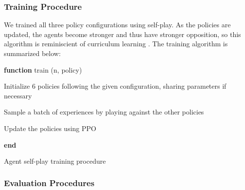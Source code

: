 \documentclass[12pt, a4paper, twocolumn]{article}
\begin{document}
\subsubsection{Training Procedure}

We trained all three policy configurations using self-play. As the policies are updated, the agents become stronger and thus have stronger opposition, so this algorithm is reminiscient of curriculum learning \cite{CurriculumLearning}. The training algorithm is summarized below:




\begin{algorithm}

  \textbf{function} train (n, policy)

  \Indp
  
  
  Initialize 6 policies following the given configuration, sharing parameters if necessary

   {
    Sample a batch of experiences by playing against the other policies

    Update the policies using PPO
  }

  \Indm
  \textbf{end}
  \caption{Agent self-play training procedure}
\end{algorithm}


\subsubsection{Evaluation Procedures}
\end{document}
